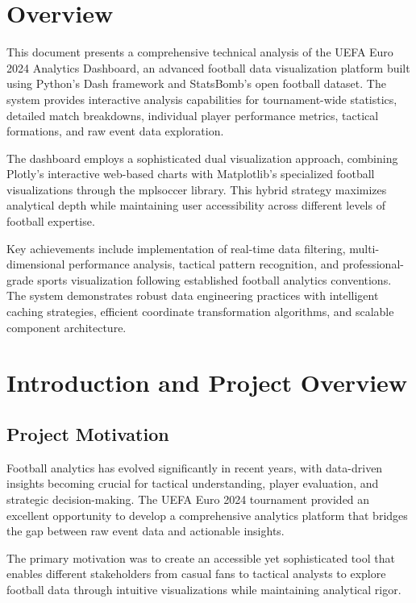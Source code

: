 \documentclass[12pt,a4paper]{article}
\begin{document}
\tableofcontents
\newpage

\section{Overview}

This document presents a comprehensive technical analysis of the UEFA Euro 2024 Analytics Dashboard, an advanced football data visualization platform built using Python's Dash framework and StatsBomb's open football dataset. The system provides interactive analysis capabilities for tournament-wide statistics, detailed match breakdowns, individual player performance metrics, tactical formations, and raw event data exploration.

The dashboard employs a sophisticated dual visualization approach, combining Plotly's interactive web-based charts with Matplotlib's specialized football visualizations through the mplsoccer library. This hybrid strategy maximizes analytical depth while maintaining user accessibility across different levels of football expertise.

Key achievements include implementation of real-time data filtering, multi-dimensional performance analysis, tactical pattern recognition, and professional-grade sports visualization following established football analytics conventions. The system demonstrates robust data engineering practices with intelligent caching strategies, efficient coordinate transformation algorithms, and scalable component architecture.

\section{Introduction and Project Overview}

\subsection{Project Motivation}

Football analytics has evolved significantly in recent years, with data-driven insights becoming crucial for tactical understanding, player evaluation, and strategic decision-making. The UEFA Euro 2024 tournament provided an excellent opportunity to develop a comprehensive analytics platform that bridges the gap between raw event data and actionable insights.

The primary motivation was to create an accessible yet sophisticated tool that enables different stakeholders from casual fans to tactical analysts to explore football data through intuitive visualizations while maintaining analytical rigor.
\end{document}
